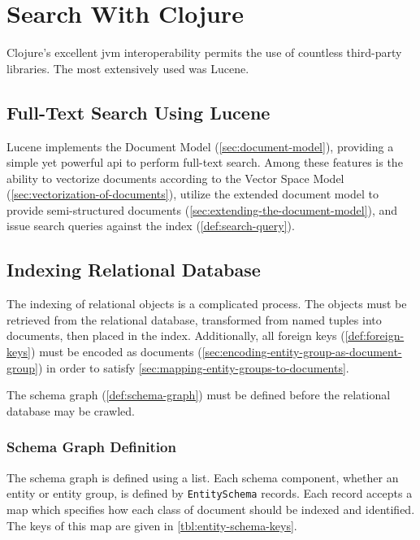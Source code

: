\section{Search With Clojure}
\label{sec:search-with-clojure}
	Clojure's excellent \gls{jvm} interoperability permits the use of countless third-party libraries.  The most extensively used was Lucene.
	
	\subsection{Full-Text Search Using Lucene}
		  Lucene implements the Document Model (\cref{sec:document-model}), providing a simple yet powerful \gls{api} to perform full-text search.  Among these features is the ability to vectorize documents according to the Vector Space Model (\cref{sec:vectorization-of-documents}), utilize the extended document model to provide semi-structured documents (\cref{sec:extending-the-document-model}), and issue search queries against the index (\cref{def:search-query}).
	
	\subsection{Indexing Relational Database}
		The indexing of relational objects is a complicated process.  The objects must be retrieved from the relational database, transformed from named tuples into documents, then placed in the index.  Additionally, all foreign keys (\cref{def:foreign-keys}) must be encoded as documents (\cref{sec:encoding-entity-group-as-document-group}) in order to satisfy \cref{sec:mapping-entity-groups-to-documents}.
		
		The schema graph (\cref{def:schema-graph}) must be defined before the relational database may be crawled.
		
		\subsubsection{Schema Graph Definition}
		\label{sec:entity-schema}
			The schema graph is defined using a list.  Each schema component, whether an entity or entity group, is defined by \texttt{EntitySchema} records.  Each record accepts a map which specifies how each class of document should be indexed and identified.  The keys of this map are given in \vref{tbl:entity-schema-keys}.
			
